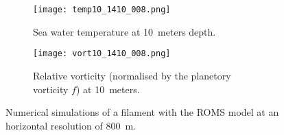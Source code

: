 \documentclass[final,table,svgnames]{article}
\begin{document}
\begin{figure}
\centering

\begin{subfigure}[t]{0.495\textwidth}
\centering
\texttt{[image: temp10\_1410\_008.png]}
\caption{Sea water temperature at 10~meters depth.}
\end{subfigure}
\begin{subfigure}[t]{0.495\textwidth}
\centering
\texttt{[image: vort10\_1410\_008.png]}
\caption{Relative vorticity (normalised by the planetory vorticity $f$) at 10~meters.}
\end{subfigure}     
     
\caption{Numerical simulations of a filament with the ROMS model at an horizontal resolution of 800~m.}
\end{figure}
\end{document}
